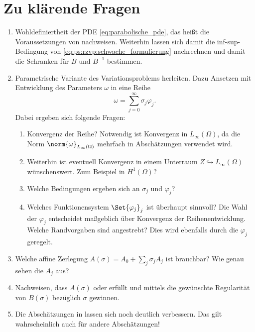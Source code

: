 

\clearpage
\section{Zu klärende Fragen} %
\label{sub:zu_kl_rende_fragen}

\begin{enumerate}
    \item Wohldefiniertheit der PDE \cref{eq:parabolische_pde}, das heißt die Voraussetzungen von  nachweisen. Weiterhin lassen sich damit die inf-sup-Bedingung von \cref{eq:ps:rzvp:schwache_formulierung} nachrechnen und damit die Schranken für $B$ und $B^{-1}$ bestimmen.
    \item Parametrische Variante des Variationsproblems herleiten.
    Dazu Ansetzen mit Entwicklung des Parameters $\omega$ in eine Reihe
    \begin{equation}
        \omega = \sum_{j = 0}^{\infty} \sigma_{j} \varphi_{j}.
    \end{equation}
    Dabei ergeben sich folgende Fragen:
    \begin{enumerate}
        \item Konvergenz der Reihe? Notwendig ist Konvergenz in $L_{\infty}(\Omega)$, da die Norm $\norm{\omega}_{L_{\infty}(\Omega)}$ mehrfach in Abschätzungen verwendet wird.
        \item Weiterhin ist eventuell Konvergenz in einem Unterraum $Z \hookrightarrow L_{\infty}(\Omega)$ wünschenswert.
        Zum Beispiel in $H^{1}(\Omega)$?
        \item Welche Bedingungen ergeben sich an $\sigma_{j}$ und $\varphi_{j}$?
        \item Welches Funktionensystem $\Set{ \varphi_{j} }_{j}$ ist überhaupt sinnvoll?
        Die Wahl der $\varphi_{j}$ entscheidet maßgeblich über Konvergenz der Reihenentwicklung.
        Welche Randvorgaben sind angestrebt?
        Dies wird ebenfalls durch die $\varphi_{j}$ geregelt.
    \end{enumerate}
    \item Welche affine Zerlegung $A(\sigma) = A_{0} + \sum_{j} \sigma_{j} A_{j}$ ist brauchbar?
    Wie genau sehen die $A_{j}$ aus?
    \item Nachweisen, dass $A(\sigma)$  oder  erfüllt und mittels  die gewünschte Regularität von $B(\sigma)$ bezüglich $\sigma$ gewinnen.
    \item Die Abschätzungen in  lassen sich noch deutlich verbessern.
    Das gilt wahrscheinlich auch für andere Abschätzungen!
\end{enumerate}

